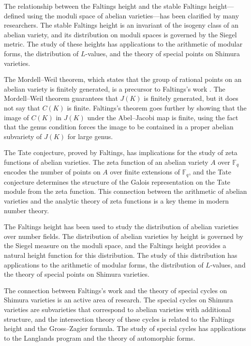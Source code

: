 The relationship between the Faltings height and the stable Faltings height---defined using the moduli space of abelian varieties---has been clarified by many researchers. The stable Faltings height is an invariant of the isogeny class of an abelian variety, and its distribution on moduli spaces is governed by the Siegel metric. The study of these heights has applications to the arithmetic of modular forms, the distribution of $L$-values, and the theory of special points on Shimura varieties.

The Mordell--Weil theorem, which states that the group of rational points on an abelian variety is finitely generated, is a precursor to Faltings's work \cite{faltings1983}. The Mordell--Weil theorem guarantees that $J(K)$ is finitely generated, but it does not say that $C(K)$ is finite. Faltings's theorem goes further by showing that the image of $C(K)$ in $J(K)$ under the Abel--Jacobi map is finite, using the fact that the genus condition forces the image to be contained in a proper abelian subvariety of $J(K)$ for large genus.

The Tate conjecture, proved by Faltings, has implications for the study of zeta functions of abelian varieties. The zeta function of an abelian variety $A$ over $\mathbb{F}_q$ encodes the number of points on $A$ over finite extensions of $\mathbb{F}_q$, and the Tate conjecture determines the structure of the Galois representation on the Tate module from the zeta function. This connection between the arithmetic of abelian varieties and the analytic theory of zeta functions is a key theme in modern number theory.

The Faltings height has been used to study the distribution of abelian varieties over number fields. The distribution of abelian varieties by height is governed by the Siegel measure on the moduli space, and the Faltings height provides a natural height function for this distribution. The study of this distribution has applications to the arithmetic of modular forms, the distribution of $L$-values, and the theory of special points on Shimura varieties.

The connection between Faltings's work \cite{faltings1983} and the theory of special cycles on Shimura varieties is an active area of research. The special cycles on Shimura varieties are subvarieties that correspond to abelian varieties with additional structure, and the intersection theory of these cycles is related to the Faltings height and the Gross--Zagier formula. The study of special cycles has applications to the Langlands program and the theory of automorphic forms.

